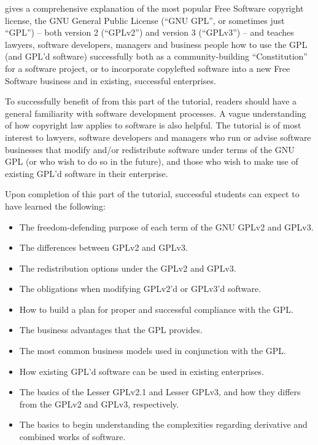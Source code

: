 \bigskip

\bigskip

 gives a
comprehensive explanation of the most popular Free Software copyright
license, the GNU General Public License (``GNU GPL'', or sometimes just
``GPL'') -- both version 2 (``GPLv2'') and version 3 (``GPLv3'') -- and
teaches lawyers, software developers, managers and business people how to use
the GPL (and GPL'd software) successfully both as a community-building
``Constitution'' for a software project, or to incorporate copylefted
software into a new Free Software business and in existing, successful
enterprises.

To successfully benefit of from this part of the tutorial, readers should
have a general familiarity with software development processes.  A vague
understanding of how copyright law applies to software is also helpful.  The
tutorial is of most interest to lawyers, software developers and managers who
run or advise software businesses that modify and/or redistribute software
under terms of the GNU GPL (or who wish to do so in the future), and those
who wish to make use of existing GPL'd software in their enterprise.

Upon completion of this part of the tutorial, successful students can expect
to have learned the following:

\begin{itemize}

  \item The freedom-defending purpose of each term of the GNU GPLv2 and GPLv3.

  \item The differences between GPLv2 and GPLv3.

  \item The redistribution options under the GPLv2 and GPLv3.

  \item The obligations when modifying GPLv2'd or GPLv3'd software.

  \item How to build a plan for proper and successful compliance with the GPL.

  \item The business advantages that the GPL provides.

  \item The most common business models used in conjunction with the GPL.

  \item How existing GPL'd software can be used in existing enterprises.

  \item The basics of the Lesser GPLv2.1 and Lesser GPLv3, and how they
    differs from the GPLv2 and GPLv3, respectively.

  \item The basics to begin understanding the complexities regarding
    derivative and combined works of software.
\end{itemize}

